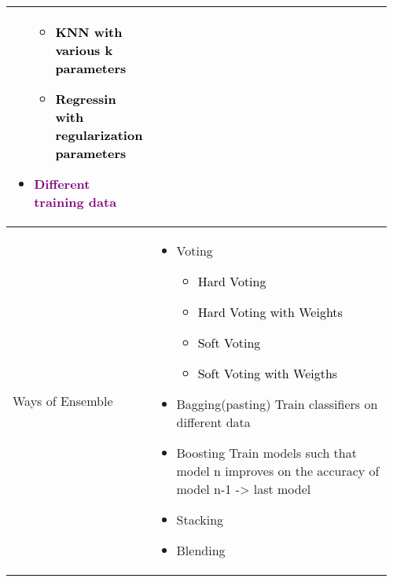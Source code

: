 \documentclass[main.tex,fontsize=8pt,paper=a4,paper=portrait,DIV=calc,]{scrartcl}
\begin{document}
\begin{table}[ht!]
\begin{tabular}{|m{0.2\linewidth}|m{0.755\linewidth}|}
\begin{itemize}
\begin{itemize}
  \item \textcolor{black}{KNN with various k parameters}
  \item \textcolor{black}{Regressin with regularization parameters}
  \end{itemize}  
\item \textcolor{purple}{Different training data}\newline
\vspace{-3mm}
\end{itemize} 
\\
\hline
Ways of Ensemble & 
\begin{itemize}
\item \textcolor{OliveGreen}{Voting}\newline
  \begin{itemize}
  \item \textcolor{black}{Hard Voting}
  \item \textcolor{black}{Hard Voting with Weights}
  \item \textcolor{black}{Soft Voting}
  \item \textcolor{black}{Soft Voting with Weigths}
  \end{itemize} 
\item \textcolor{OliveGreen}{Bagging(pasting)}\newline
  Train classifiers on different data
\item \textcolor{OliveGreen}{Boosting}\newline
  Train models such that model n improves on the accuracy of model n-1 -> last model
\item \textcolor{OliveGreen}{Stacking}
\item \textcolor{OliveGreen}{Blending}
\vspace{-3mm}
\end{itemize} 
\\
\hline
\end{tabular}
\end{table}
\pagebreak
\end{document}
